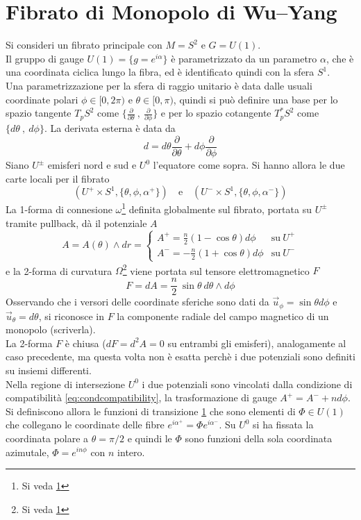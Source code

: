 \section{Fibrato di Monopolo di Wu–Yang}
Si consideri un fibrato principale con $M = S^2$ e $G = U(1)$.\\
Il gruppo di gauge $U(1) = \{g = e^{i\alpha} \}$ è parametrizzato da un
parametro $\alpha$, che è una coordinata ciclica lungo la fibra, ed è identificato
quindi con la sfera $S^1$.\\
Una parametrizzazione per la sfera di raggio unitario è data dalle usuali
coordinate polari $\phi \in[0,2\pi)$ e $\theta \in [0,\pi)$,
quindi si può definire una base per lo spazio tangente $T_pS^2$ come
$\{ \frac{\partial}{\partial \theta} \: , \: \frac{\partial}{\partial \phi } \}$
e per lo spazio cotangente $T^*_pS^2$ come $\{ d\theta \: , \: d\phi \}$.
La derivata esterna è data da
$$
   d = d\theta \frac{\partial}{\partial \theta}
     + d\phi   \frac{\partial}{\partial \phi }
$$
Siano $U^\pm$ emisferi nord e sud e $U^0$ l'equatore come sopra.
Si hanno allora le due carte locali per il fibrato
$$
   ( U^+ \times S^1 , \{ \theta, \phi,\alpha^+ \} ) \quad \mathrm{e}\quad
   ( U^- \times S^1 , \{ \theta, \phi,\alpha^- \} )
$$
La 1-forma di connesione $\omega$\footnote{Si veda \ref{}}
definita globalmente sul fibrato, portata su $U^\pm$ tramite pullback,
dà il potenziale $A$
$$
   A = A(\theta)\wedge dr =  \begin{cases}
      A^+ =  \frac{n}{2}(1 - \cos\theta ) d\phi & \mathrm{su \:} U^+ \\
      A^- = -\frac{n}{2}(1 + \cos\theta ) d\phi & \mathrm{su \:} U^-
   \end{cases}
$$
e la 2-forma di curvatura $\Omega$\footnote{Si veda \ref{}} viene portata
sul tensore elettromagnetico $F$
$$
   F = dA = \frac{n}{2} \: \sin\theta \: d\theta \wedge d\phi
$$
Osservando che i versori delle coordinate sferiche sono dati da
$\vec u _\phi = \sin\theta d\phi$ e $ \vec u _\theta = d\theta$, si riconosce in
$F$ la componente radiale del campo magnetico di un monopolo (scriverla).\\

La 2-forma $F$ è chiusa ($dF = d^2A = 0$ su entrambi gli emisferi),
analogamente al caso precedente, ma questa volta non è esatta perchè i due potenziali
sono definiti su insiemi differenti.\\

Nella regione di intersezione $U^0$ i due potenziali sono vincolati dalla condizione
di compatibilità \ref{eq:condcompatibility}, la trasformazione di gauge
$A^+ = A^- + n d \phi$. Si definiscono allora le funzioni di transizione \ref{}
che sono elementi di $\Phi \in U(1)$ che collegano le coordinate delle fibre
$e^{i\alpha^+} = \Phi e^{i\alpha^-}$. Su $U^0$ si ha fissata la coordinata polare
a $\theta = \pi/2$ e quindi le $\Phi$ sono funzioni della sola coordinata azimutale,
$ \Phi = e^{in\phi}$ con $n$ intero.\\

